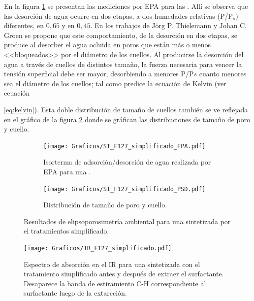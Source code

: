 		En la figura \ref{fig:F127_simplificado_EPA} se presentan las mediciones por EPA  para las \pdmF. Allí se observa que las desorción de agua ocurre en dos etapas, a dos humedades relativas (P/P$_s$) diferentes, en $0,65$ y en $0,45$. En los trabajos de Jörg P. Thielemann \cite{Thielemann2011} y Johan C. Groen\cite{Groen2003} se propone que este comportamiento, de la desorción en dos etapas, se produce al desorber el agua ocluida en poros que están más o menos <<bloqueados>> por el diámetro de los cuellos. Al producirse la desorción del agua a través de cuellos de distintos tamaño, la fuerza  necesaria para vencer la tensión superficial debe ser mayor, desorbiendo a menores P/P$s$ cuanto menores sea el diámetro de los cuellos; tal como predice la ecuación de Kelvin (ver ecuación {\ref{eq:kelvin}). Esta doble distribución de tamaño de cuellos también se ve reflejada en el gráfico de la figura \ref{fig:F127_simplificado_PSD} donde se gráfican las distribuciones de tamaño de poro y cuello.

			\begin{figure}[th]
			  	\begin{subfigure}[t]{0.495\textwidth}
			  	\texttt{[image: Graficos/SI\_F127\_simplificado\_EPA.pdf]}
				\caption{Isorterma de adsorción/desorción de agua realizada por EPA para una \pdmF.}
				\label{fig:F127_simplificado_EPA}
				\end{subfigure}
				\begin{subfigure}[t]{0.495\textwidth}
			  	\texttt{[image: Graficos/SI\_F127\_simplificado\_PSD.pdf]}
				\caption{Distribución de tamaño de poro y cuello.\\ }
				\label{fig:F127_simplificado_PSD}
				\end{subfigure}
				\caption[Elipsoporosimetría \pdmF\space tratamiento simplificado.]{Resultados de elipsoporosimetría ambiental para una \pdmF\space sintetizada por el tratamientos simplificado.}
				\label{fig:F127_simplificado}
				\end{figure}

			\begin{figure}[ht]
				\begin{center}
				\texttt{[image: Graficos/IR\_F127\_simplificado.pdf]}
				\caption[FTIR \pdmF\space tratamiento simplificado.]{Espectro de absorción en el IR para una \pdmF\space sintetizada con el tratamiento simplificado antes y después de extraer el surfactante. Desaparece la banda de estiramiento C-H correspondiente al surfactante luego de la extarcción.}
				\label{fig:IR_F127_simplificado}
				\end{center}
				\end{figure}

}
